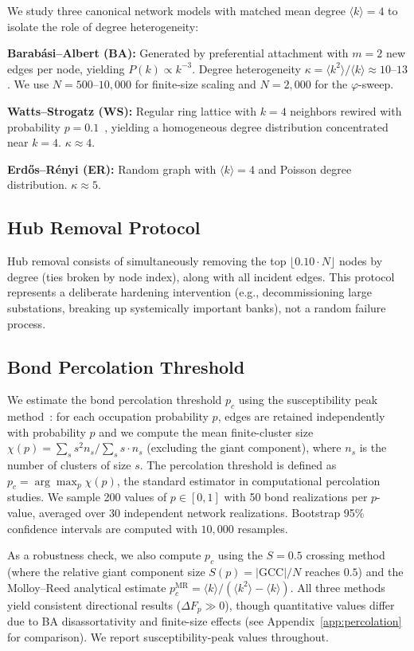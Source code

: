 \documentclass[aps,pre,twocolumn,superscriptaddress,showpacs]{revtex4-2}
\newcommand{\avg}[1]{\langle #1 \rangle}
\newcommand{\pc}{p_c}
\newcommand{\DF}{\Delta F}
\begin{document}
We study three canonical network models with matched mean degree $\avg{k} = 4$ to isolate the role of degree heterogeneity:

\textbf{Barab\'asi--Albert (BA):} Generated by preferential attachment with $m=2$ new edges per node, yielding $P(k) \propto k^{-3}$. Degree heterogeneity $\kappa = \avg{k^2}/\avg{k} \approx 10$--$13$. We use $N=500$--$10{,}000$ for finite-size scaling and $N=2{,}000$ for the $\varphi$-sweep.

\textbf{Watts--Strogatz (WS):} Regular ring lattice with $k=4$ neighbors rewired with probability $p=0.1$~\cite{WattsStrogatz1998}, yielding a homogeneous degree distribution concentrated near $k=4$. $\kappa \approx 4$.

\textbf{Erd\H{o}s--R\'enyi (ER):} Random graph with $\avg{k} = 4$ and Poisson degree distribution. $\kappa \approx 5$.

\subsection{Hub Removal Protocol}

Hub removal consists of simultaneously removing the top $\lfloor 0.10 \cdot N \rfloor$ nodes by degree (ties broken by node index), along with all incident edges. This protocol represents a deliberate hardening intervention (e.g., decommissioning large substations, breaking up systemically important banks), not a random failure process.

\subsection{Bond Percolation Threshold}

We estimate the bond percolation threshold $\pc$ using the susceptibility peak method~\cite{Newman2001}: for each occupation probability $p$, edges are retained independently with probability $p$ and we compute the mean finite-cluster size $\chi(p) = \sum_s s^2 n_s / \sum_s s \cdot n_s$ (excluding the giant component), where $n_s$ is the number of clusters of size $s$. The percolation threshold is defined as $\pc = \arg\max_p \chi(p)$, the standard estimator in computational percolation studies. We sample 200 values of $p \in [0,1]$ with 50 bond realizations per $p$-value, averaged over 30 independent network realizations. Bootstrap 95\% confidence intervals are computed with $10{,}000$ resamples.

As a robustness check, we also compute $\pc$ using the $S=0.5$ crossing method (where the relative giant component size $S(p) = |\mathrm{GCC}|/N$ reaches $0.5$) and the Molloy--Reed analytical estimate $p_c^{\mathrm{MR}} = \avg{k}/(\avg{k^2} - \avg{k})$. All three methods yield consistent directional results ($\DF_p \gg 0$), though quantitative values differ due to BA disassortativity and finite-size effects (see Appendix~\ref{app:percolation} for comparison). We report susceptibility-peak values throughout.
\end{document}
